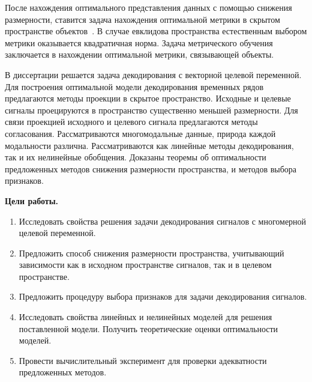 После нахождения оптимального представления данных с помощью снижения размерности, ставится задача нахождения оптимальной метрики в скрытом пространстве объектов~\cite{davis2007information,kulis2012metric,yang2006distance,weinberger2009distance}.
В случае евклидова пространства естественным выбором метрики оказывается квадратичная норма.
Задача метрического обучения заключается в нахождении оптимальной метрики, связывающей объекты.

В диссертации решается задача декодирования с векторной целевой переменной. 
Для построения оптимальной модели декодирования временных рядов предлагаются методы проекции в скрытое пространство.
Исходные и целевые сигналы проецируются в пространство существенно меньшей размерности. 
Для связи проекцией исходного и целевого сигнала предлагаются методы согласования.
Рассматриваются многомодальные данные, природа каждой модальности различна.
Рассматриваются как линейные методы декодирования, так и их нелинейные обобщения.
Доказаны теоремы об оптимальности предложенных методов снижения размерности пространства, и методов выбора признаков.

\vspace{0.5cm}
\textbf{Цели работы.}
\begin{enumerate}
	\item Исследовать свойства решения задачи декодирования сигналов с многомерной целевой переменной.
	\item Предложить способ снижения размерности пространства, учитывающий зависимости как в исходном пространстве сигналов, так и в целевом пространстве.
	\item Предложить процедуру выбора признаков для задачи декодирования сигналов.
	\item Исследовать свойства линейных и нелинейных моделей для решения поставленной модели. Получить теоретические оценки оптимальности моделей.
	\item Провести вычислительный эксперимент для проверки адекватности предложенных методов.
\end{enumerate}


